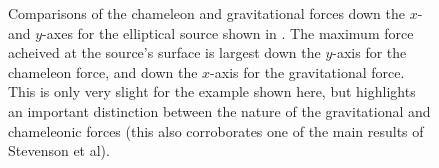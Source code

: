 \documentclass[a4paper, 12pt]{article}
\numberwithin{equation}{section}
\begin{document}
\begin{figure}[!t]
      \begin{center}
      \end{center}
\caption{  Comparisons of the chameleon and gravitational forces down the $x$- and $y$-axes for the elliptical source shown in . The maximum force acheived at the source's surface is largest down the $y$-axis for the chameleon force, and down the $x$-axis for the gravitational force. This is only very slight for the example shown here, but highlights an important distinction between the nature of the gravitational and chameleonic forces (this also corroborates one of the main results of Stevenson et al).}\label{fig:el-1dplots}
\end{figure}
\end{document}

